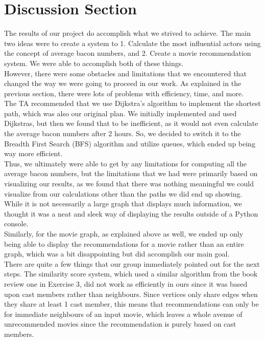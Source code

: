 \documentclass{article}
\begin{document}
\section*{Discussion Section}
The results of our project do accomplish what we strived to achieve. The main two ideas were to create a system to 1. Calculate the most influential actors using the concept of average bacon numbers, and 2. Create a movie recommendation system. We were able to accomplish both of these things. \\

However, there were some obstacles and limitations that we encountered that changed the way we were going to proceed in our work. As explained in the previous section, there were lots of problems with efficiency, time, and more. \\

The TA recommended that we use Dijkstra’s algorithm to implement the shortest path, which was also our original plan. We initially implemented and used Dijkstras, but then we found that to be inefficient, as it would not even calculate the average bacon numbers after 2 hours. So, we decided to switch it to the Breadth First Search (BFS) algorithm and utilize queues, which ended up being way more efficient. \\

Thus, we ultimately were able to get by any limitations for computing all the average bacon numbers, but the limitations that we had were primarily based on visualizing our results, as we found that there was nothing meaningful we could visualize from our calculations other than the paths we did end up showing. While it is not necessarily a large graph that displays much information, we thought it was a neat and sleek way of displaying the results outside of a Python console. \\

Similarly, for the movie graph, as explained above as well, we ended up only being able to display the recommendations for a movie rather than an entire graph, which was a bit disappointing but did accomplish our main goal. \\

There are quite a few things that our group immediately pointed out for the next steps. The similarity score system, which used a similar algorithm from the book review one in Exercise 3, did not work as efficiently in ours since it was based upon cast members rather than neighbours. Since vertices only share edges when they share at least 1 cast member, this means that recommendations can only be for immediate neighbours of an input movie, which leaves a whole avenue of unrecommended movies since the recommendation is purely based on cast members. \\
\end{document}
